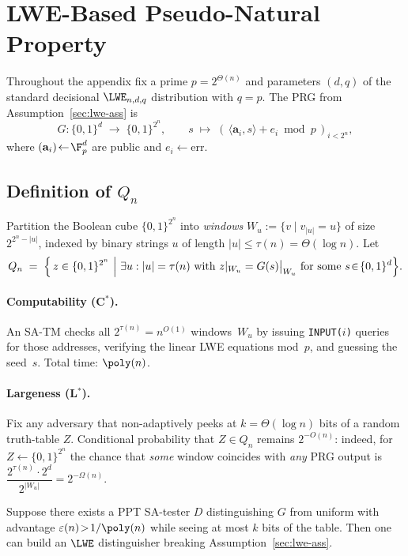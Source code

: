 \section{LWE-Based Pseudo-Natural Property}\label{sec:lwe-app}

Throughout the appendix fix a prime $p=2^{\Theta(n)}$
and parameters $(d,q)$ of the standard decisional
$\LWE_{n,d,q}$ distribution with $q=p$.
The PRG from Assumption~\ref{sec:lwe-ass} is
\[
   G:\{0,1\}^d \;\longrightarrow\; \{0,1\}^{2^n},
   \qquad s\;\mapsto\; (\,\langle\mathbf a_i,s\rangle + e_i\bmod p\,)_{i<2^n},
\]
where $(\mathbf a_i)\!\leftarrow\!\F_p^{d}$ are public
and $e_i\!\leftarrow\!\text{err}$.

\subsection{Definition of $Q_n$}

Partition the Boolean cube
$\{0,1\}^{2^n}$ into \emph{windows}
$W_{u}:=\{v\mid v_{|u|}=u\}$ of size $2^{2^n-|u|}$,
indexed by binary strings $u$ of length $|u|\le \tau(n)=\Theta(\log n)$.
Let
\[
  Q_n \;=\;
  \Bigl\{\,z\in\{0,1\}^{2^n} \ \Big|\  
     \exists u:|u|=\tau(n) \text{ with } 
     z|_{W_u} = G(s)\big|_{W_u}\text{ for some }s\!\in\!\{0,1\}^d
  \Bigr\}.
\]

\paragraph{Computability (C$^*$).}
An SA-TM checks all $2^{\tau(n)}\!=\!n^{O(1)}$ windows~$W_u$
by issuing \texttt{INPUT($i$)} queries for those addresses,
verifying the linear LWE equations mod~$p$,
and guessing the seed~$s$.  Total time: $\poly(n)$.

\paragraph{Largeness (L$^*$).}
Fix any adversary that non-adaptively peeks at 
$k=\Theta(\log n)$ bits of a random truth-table $Z$.
Conditional probability that $Z\!\in\!Q_n$ remains
$2^{-O(n)}$: indeed, for $Z\!\leftarrow\!\{0,1\}^{2^n}$
the chance that \emph{some} window coincides 
with \emph{any} PRG output is
$\dfrac{2^{\tau(n)}\cdot 2^{d}}{2^{|W_u|}}=2^{-\Omega(n)}$.

\begin{lemma}\label{lem:lwe-hybrid}
Suppose there exists a PPT SA-tester
$D$ distinguishing $G$ from uniform with
advantage $\varepsilon(n)\!>\!1/\poly(n)$
while seeing at most $k$ bits of the table.
Then one can build an $\LWE$ distinguisher
breaking Assumption~\ref{sec:lwe-ass}.
\end{lemma}


